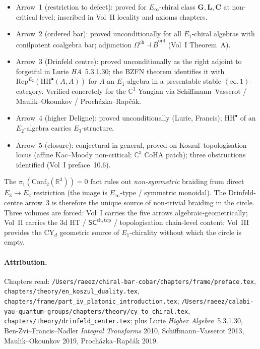 \documentclass[11pt]{article}
\theoremstyle{definition}
\theoremstyle{remark}
\newcommand{\bC}{\mathbb{C}}
\newcommand{\bR}{\mathbb{R}}
\newcommand{\Rep}{\mathrm{Rep}}
\newcommand{\Eone}{E_1}
\newcommand{\Etwo}{E_2}
\newcommand{\Ethree}{E_3}
\newcommand{\Einf}{E_\infty}
\newcommand{\Conf}{\mathrm{Conf}}
\newcommand{\HH}{\mathrm{HH}}
\newcommand{\SCchtop}{\mathsf{SC}^{\mathrm{ch,top}}}
\newcommand{\barB}{\bar B}
\begin{document}
\begin{itemize}
\item Arrow~1 (restriction to defect): proved for
$\Einf$-chiral class $\mathbf{G, L, C}$ at non-critical level;
inscribed in Vol~II locality and axioms chapters.

\item Arrow~2 (ordered bar): proved unconditionally for all
$\Eone$-chiral algebras with conilpotent coalgebra bar;
adjunction $\Omega^{\mathrm{ch}} \dashv \barB^{\mathrm{ord}}$
(Vol~I Theorem~A).

\item Arrow~3 (Drinfeld centre): proved unconditionally as the
right adjoint to forgetful in Lurie \emph{HA}~5.3.1.30; the
BZFN theorem identifies it with $\Rep^{\Etwo}(\HH^\bullet(A, A))$
for $A$ an $\Eone$-algebra in a presentable stable
$(\infty,1)$-category. Verified concretely for the $\bC^3$
Yangian via Schiffmann--Vasserot / Maulik--Okounkov /
Procházka--Rapčák.

\item Arrow~4 (higher Deligne): proved unconditionally (Lurie,
Francis); $\HH^\bullet$ of an $\Etwo$-algebra carries
$\Ethree$-structure.

\item Arrow~5 (closure): conjectural in general, proved on
Koszul--topologisation locus (affine Kac--Moody non-critical;
$\bC^3$ CoHA patch); three obstructions identified (Vol~I
preface~10.6).
\end{itemize}

The $\pi_1(\Conf_2(\bR^3)) = 0$ fact rules out \emph{non-symmetric}
braiding from direct $\Ethree \to \Etwo$ restriction (the image is
$\Einf$-type / symmetric monoidal). The Drinfeld-centre arrow~3 is
therefore the unique source of non-trivial braiding in the circle.
Three volumes are forced: Vol~I carries the five arrows
algebraic-geometrically; Vol~II carries the $3$d HT /
$\SCchtop$ / topologisation chain-level content; Vol~III provides
the CY$_d$ geometric source of $\Eone$-chirality without which
the circle is empty.

\paragraph{Attribution.} Chapters read:
\texttt{/Users/raeez/chiral-bar-cobar/chapters/frame/preface.tex},
\texttt{chapters/theory/en\_koszul\_duality.tex},
\texttt{chapters/frame/part\_iv\_platonic\_introduction.tex};
\texttt{/Users/raeez/calabi-yau-quantum-groups/chapters/theory/cy\_to\_chiral.tex},
\texttt{chapters/theory/drinfeld\_center.tex};
plus Lurie \emph{Higher Algebra}~5.3.1.30, Ben-Zvi--Francis--Nadler
\emph{Integral Transforms} 2010, Schiffmann--Vasserot 2013,
Maulik--Okounkov 2019, Procházka--Rapčák 2019.
\end{document}
